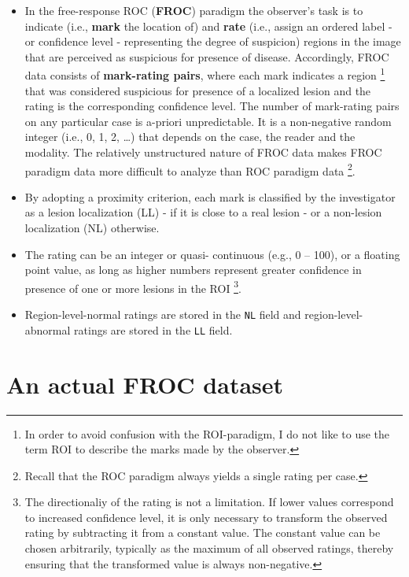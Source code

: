 \documentclass[]{book}
\let\rmarkdownfootnote\footnote%
\def\footnote{\protect\rmarkdownfootnote}
\begin{document}
\begin{itemize}
\item
  In the free-response ROC (\textbf{FROC}) paradigm \citep{RN85} the observer's task is to indicate (i.e., \textbf{mark} the location of) and \textbf{rate} (i.e., assign an ordered label - or confidence level - representing the degree of suspicion) regions in the image that are perceived as suspicious for presence of disease. Accordingly, FROC data consists of \textbf{mark-rating pairs}, where each mark indicates a region \footnote{In order to avoid confusion with the ROI-paradigm, I do not like to use the term ROI to describe the marks made by the observer.} that was considered suspicious for presence of a localized lesion and the rating is the corresponding confidence level. The number of mark-rating pairs on any particular case is a-priori unpredictable. It is a non-negative random integer (i.e., 0, 1, 2, \ldots{}) that depends on the case, the reader and the modality. The relatively unstructured nature of FROC data makes FROC paradigm data more difficult to analyze than ROC paradigm data \footnote{Recall that the ROC paradigm always yields a single rating per case.}.
\item
  By adopting a proximity criterion, each mark is classified by the investigator as a lesion localization (LL) - if it is close to a real lesion - or a non-lesion localization (NL) otherwise.
\item
  The rating can be an integer or quasi- continuous (e.g., 0 -- 100), or a floating point value, as long as higher numbers represent greater confidence in presence of one or more lesions in the ROI \footnote{The directionaliy of the rating is not a limitation. If lower values correspond to increased confidence level, it is only necessary to transform the observed rating by subtracting it from a constant value. The constant value can be chosen arbitrarily, typically as the maximum of all observed ratings, thereby ensuring that the transformed value is always non-negative.}.
\item
  Region-level-normal ratings are stored in the \texttt{NL} field and region-level-abnormal ratings are stored in the \texttt{LL} field.
\end{itemize}

\hypertarget{an-actual-froc-dataset}{%
\section{An actual FROC dataset}\label{an-actual-froc-dataset}}
\end{document}
